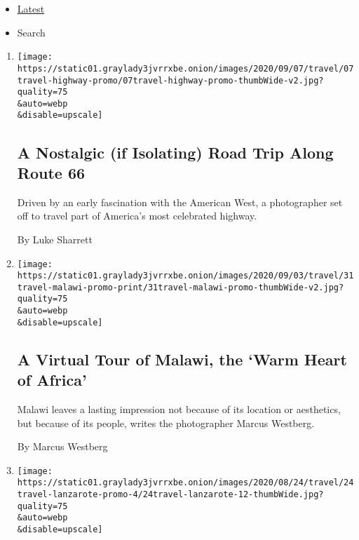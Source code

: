 \begin{itemize}
\tightlist
\item
  \protect\hyperlink{stream-panel}{Latest}
\item
  Search
\end{itemize}

\begin{enumerate}
\def\labelenumi{\arabic{enumi}.}
\item
  \href{/2020/09/07/travel/route-66.html}{}

  \texttt{[image: https://static01.graylady3jvrrxbe.onion/images/2020/09/07/travel/07travel-highway-promo/07travel-highway-promo-thumbWide-v2.jpg?quality=75\\\&auto=webp\\\&disable=upscale]}

  \hypertarget{a-nostalgic-if-isolating-road-trip-along-route-66}{%
  \subsection{A Nostalgic (if Isolating) Road Trip Along Route
  66}\label{a-nostalgic-if-isolating-road-trip-along-route-66}}

  Driven by an early fascination with the American West, a photographer
  set off to travel part of America's most celebrated highway.

  By Luke Sharrett
\item
  \href{/2020/08/31/travel/malawi.html}{}

  \texttt{[image: https://static01.graylady3jvrrxbe.onion/images/2020/09/03/travel/31travel-malawi-promo-print/31travel-malawi-promo-thumbWide-v2.jpg?quality=75\\\&auto=webp\\\&disable=upscale]}

  \hypertarget{a-virtual-tour-of-malawi-the-warm-heart-of-africa}{%
  \subsection{A Virtual Tour of Malawi, the `Warm Heart of
  Africa'}\label{a-virtual-tour-of-malawi-the-warm-heart-of-africa}}

  Malawi leaves a lasting impression not because of its location or
  aesthetics, but because of its people, writes the photographer Marcus
  Westberg.

  By Marcus Westberg
\item
  \href{/2020/08/24/travel/lanzarote-canary-islands.html}{}

  \texttt{[image: https://static01.graylady3jvrrxbe.onion/images/2020/08/24/travel/24travel-lanzarote-promo-4/24travel-lanzarote-12-thumbWide.jpg?quality=75\\\&auto=webp\\\&disable=upscale]}


\end{enumerate}
